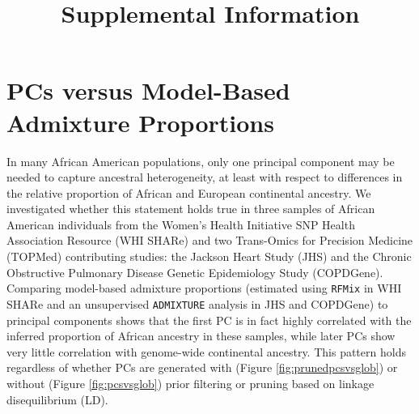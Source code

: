\documentclass[12pt]{article}
\title{Supplemental Information}
\begin{document}
\maketitle
\tableofcontents %

\newpage
\listoffigures

\newpage


\newpage
\section{PCs versus Model-Based Admixture Proportions}

In many African American populations, only one principal component may be needed to capture ancestral heterogeneity, at least with respect to differences in the relative proportion of African and European continental ancestry.
We investigated whether this statement holds true in three samples of African American individuals from the Women's Health Initiative SNP Health Association Resource (WHI SHARe) and two Trans-Omics for Precision Medicine (TOPMed) contributing studies: the Jackson Heart Study (JHS) and the Chronic Obstructive Pulmonary Disease Genetic Epidemiology Study (COPDGene).
Comparing model-based admixture proportions (estimated using \texttt{RFMix} \citep{rfmix} in WHI SHARe and an unsupervised \texttt{ADMIXTURE} \citep{admixture} analysis in JHS and COPDGene) to principal components shows that the first PC is in fact highly correlated with the inferred proportion of African ancestry in these samples, while later PCs show very little correlation with genome-wide continental ancestry.
This pattern holds regardless of whether PCs are generated with (Figure \ref{fig:prunedpcsvsglob}) or without (Figure \ref{fig:pcsvsglob}) prior filtering or pruning based on linkage disequilibrium (LD).
\end{document}
